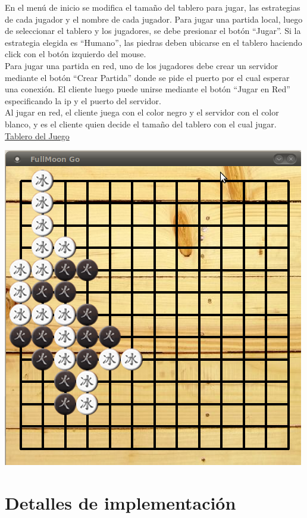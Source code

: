 \documentclass[11pt]{article}
\begin{document}
En el men\'u de inicio se modifica el tama\~no del tablero para jugar, las estrategias de cada jugador y el nombre de cada jugador.
Para jugar una partida local, luego de seleccionar el tablero y los jugadores, se debe presionar el bot\'on ``Jugar''. Si la estrategia
elegida es ``Humano'', las piedras deben ubicarse en el tablero haciendo click con el bot\'on izquierdo del mouse. \\
Para jugar una partida en red, uno de los jugadores debe crear un servidor mediante el bot\'on ``Crear Partida'' donde se pide
el puerto por el cual esperar una conexi\'on. El cliente luego puede unirse mediante el bot\'on ``Jugar en Red'' especificando
la ip y el puerto del servidor.\\ 
Al jugar en red, el cliente juega con el color negro y el servidor con el color blanco, y es el cliente quien decide
el tama\~no del tablero con el cual jugar.\\

\underline{Tablero del Juego}
\begin{center}
 \includegraphics[scale=0.55]{./Diagramas/captura_tablero.png}
\end{center}


\section{Detalles de implementación}
\label{sec-4}
\end{document}
